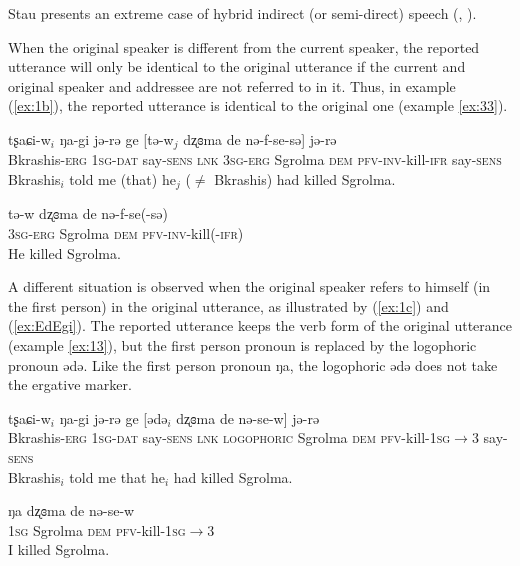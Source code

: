 \documentclass[oneside,a4paper,11pt]{article}
\newcommand{\ipa}[1]{{\phon #1}} %
\newcommand{\ipapl}[1]{{\phon #1}} %
\newcommand{\dat}{\textsc{dat}}
\newcommand{\dem}{\textsc{dem}}
\newcommand{\evid}{\textsc{ifr}}
\newcommand{\erg}{\textsc{erg}}
\newcommand{\inv}{\textsc{inv}}
\newcommand{\prf}{\textsc{pfv}}
\newcommand{\sg}{\textsc{sg}}
\newcommand{\sens}{\textsc{sens}}
\begin{document}
Stau presents an extreme case of hybrid indirect (or semi-direct)  speech  (\citealt{aikhenvald08semidirect}, \citealt{tournadre08conjunct}). 

When the original speaker is different from the current speaker, the reported utterance will only be identical to the original utterance if the current and original speaker and addressee are not referred to in it. Thus, in example (\ref{ex:1b}), the reported utterance is identical to the original one (example \ref{ex:33}).


\begin{exe}
\ex \label{ex:1b}
\gll
	\ipa{tʂaɕi-w}$_i$ \ipa{ŋa-gi}	\ipa{jə-rə} \ipa{ge} [\ipapl{tə-w}$_j$	\ipapl{dʐɞma} 	\ipapl{de} \ipapl{nə-f-se-sə}] \ipa{jə-rə}  \\
	{Bkrashis-\erg} {1\sg-\dat} {say-\sens} \textsc{lnk} {3\sg-\erg} Sgrolma {\dem} {\prf-\inv-kill-\evid}  say-\sens\\ 
	\glt Bkrashis$_i$ told me (that) he$_j$ ($\ne$ Bkrashis) had killed Sgrolma.
\end{exe}


\begin{exe}
\ex \label{ex:33}
\gll
	\ipa{tə-w} \ipapl{dʐɞma} \ipapl{de} \ipapl{nə-f-se(-sə)} \\
	{3\sg-\erg} Sgrolma {\dem} {\prf-\inv-kill(-\evid)}\\ 
	\glt He killed Sgrolma.
\end{exe}

A different situation is observed when the original speaker refers to himself (in the first person) in the original utterance, as illustrated by (\ref{ex:1c}) and (\ref{ex:EdEgi}).  The reported utterance keeps the verb form of the original utterance (example \ref{ex:13}), but the first person pronoun is replaced by the logophoric pronoun \ipa{ədə}. Like the first person pronoun \ipa{ŋa}, the logophoric \ipa{ədə} does not take the ergative marker.

\begin{exe}
\ex \label{ex:1c}
\gll
	\ipa{tʂaɕi-w}$_i$ \ipa{ŋa-gi}	\ipa{jə-rə} \ipa{ge} [\ipapl{ədə}$_i$	\ipapl{dʐɞma} 	\ipapl{de} 	\ipapl{nə-se-w}] \ipa{jə-rə}  \\
	{Bkrashis-\erg} {1\sg-\dat} {say-\sens} \textsc{lnk} \textsc{logophoric} Sgrolma {\dem} {\prf-kill-1\sg$\rightarrow$3} say-\sens\\ 
	\glt Bkrashis$_i$ told me that he$_i$ had killed Sgrolma.
\end{exe}


\begin{exe}
\ex \label{ex:13}
\gll
	\ipa{ŋa}	\ipapl{dʐɞma} 	\ipapl{de} 	\ipapl{nə-se-w} \\
	{1\sg} Sgrolma {\dem} {\prf-kill-1\sg$\rightarrow$3}\\ 
	\glt I killed Sgrolma.
\end{exe}
\end{document}
